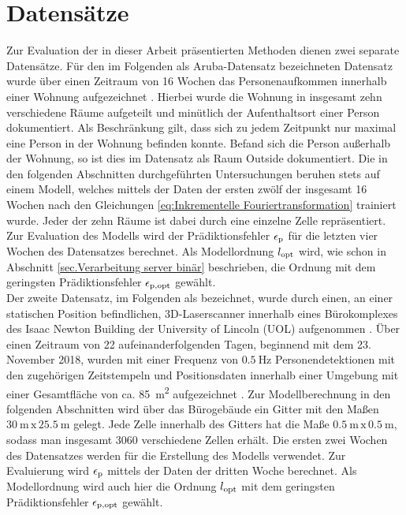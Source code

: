 \section{Datensätze}
\label{sec.Datensätze}
Zur Evaluation der in dieser Arbeit präsentierten Methoden dienen zwei separate Datensätze. Für den im Folgenden als  \glqq Aruba-Datensatz\grqq{} bezeichneten Datensatz wurde über einen Zeitraum von 16 Wochen das Personenaufkommen innerhalb einer Wohnung aufgezeichnet \cite{aruba}. Hierbei wurde die Wohnung in insgesamt zehn verschiedene Räume aufgeteilt und minütlich der Aufenthaltsort einer Person dokumentiert. Als Beschränkung gilt, dass sich zu jedem Zeitpunkt nur maximal eine Person in der Wohnung befinden konnte. Befand sich die Person außerhalb der Wohnung, so ist dies im Datensatz als Raum \glqq Outside\grqq{} dokumentiert.
Die in den folgenden Abschnitten durchgeführten Untersuchungen beruhen stets auf einem Modell, welches mittels der Daten der ersten zwölf der insgesamt 16 Wochen nach den Gleichungen \ref{eq:Inkrementelle Fouriertransformation} trainiert wurde. Jeder der zehn Räume ist dabei durch eine einzelne Zelle repräsentiert. Zur Evaluation des Modells wird der Prädiktionsfehler $\epsilon_{\mathrm{p}}$ für die letzten vier Wochen des Datensatzes berechnet. Als Modellordnung $l_{\mathrm{opt}}$ wird, wie schon in Abschnitt \ref{sec.Verarbeitung server binär} beschrieben, die Ordnung mit dem geringsten Prädiktionsfehler $\epsilon_{\mathrm{p,opt}}$ gewählt.  \\
Der zweite Datensatz, im Folgenden als \grqq{} bezeichnet, wurde durch einen, an einer statischen Position befindlichen, 3D-Laserscanner innerhalb eines Bürokomplexes des Isaac Newton Building der University of Lincoln (UOL) aufgenommen \cite{uol}. Über einen Zeitraum von 22 aufeinanderfolgenden Tagen, beginnend mit dem 23. November 2018, wurden mit einer Frequenz von $\SI{0.5}{\hertz}$ Personendetektionen mit den zugehörigen Zeitstempeln und Positionsdaten innerhalb einer Umgebung mit einer Gesamtfläche von ca. \SI{85}{\metre\squared} aufgezeichnet \cite{uol}. Zur Modellberechnung in den folgenden Abschnitten wird über das Bürogebäude ein Gitter mit den Maßen $\SI{30}{\metre} \, \mathrm{x} \, \SI{25.5}{\metre}$ gelegt. Jede Zelle innerhalb des Gitters hat die Maße $\SI{0.5}{\metre} \, \mathrm{x} \, \SI{0.5}{\metre}$, sodass man insgesamt 3060 verschiedene Zellen erhält. Die ersten zwei Wochen des Datensatzes werden für die Erstellung des Modells verwendet. Zur Evaluierung wird $\epsilon_{\mathrm{p}}$ mittels der Daten der dritten Woche berechnet. Als Modellordnung wird auch hier die Ordnung $l_{\mathrm{opt}}$ mit dem geringsten Prädiktionsfehler $\epsilon_{\mathrm{p,opt}}$ gewählt. 

